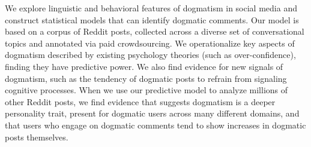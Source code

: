 We explore linguistic and behavioral features of dogmatism in social media and construct statistical models that can identify dogmatic comments. Our model is based on a corpus of Reddit posts, collected across a diverse set of conversational topics and annotated via paid crowdsourcing. We operationalize key aspects of dogmatism described by existing psychology theories (such as over-confidence), finding they have predictive power. We also find evidence for new signals of dogmatism, such as the tendency of dogmatic posts to refrain from signaling cognitive processes. When we use our predictive model to analyze millions of other Reddit posts, we find evidence that suggests dogmatism is a deeper personality trait, present for dogmatic users across many different domains, and that users who engage on dogmatic comments tend to show increases in dogmatic posts themselves.

